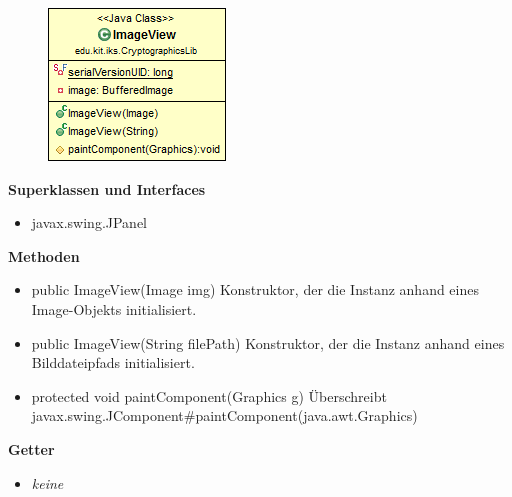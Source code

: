 \documentclass{article}
\begin{document}
      \begin{figure}[H]
        \centering
        \includegraphics[width=\textwidth]{resources/edu-kit-iks-CryptographicsLib-ImageView}
      \end{figure}
	
      \textbf{Superklassen und Interfaces}
      \begin{itemize}
        \item javax.swing.JPanel
      \end{itemize}
	
      \textbf{Methoden}
      \begin{itemize}
        \item public ImageView(Image img) \newline
          Konstruktor, der die Instanz anhand eines Image-Objekts initialisiert.
        \item public ImageView(String filePath) \newline
          Konstruktor, der die Instanz anhand eines Bilddateipfads initialisiert.
        \item protected void paintComponent(Graphics g) \newline
          Überschreibt javax.swing.JComponent\#paintComponent(java.awt.Graphics)
      \end{itemize}
      
      \textbf{Getter}
      \begin{itemize}
		\item \textit{keine}
      \end{itemize}
      
\end{document}
